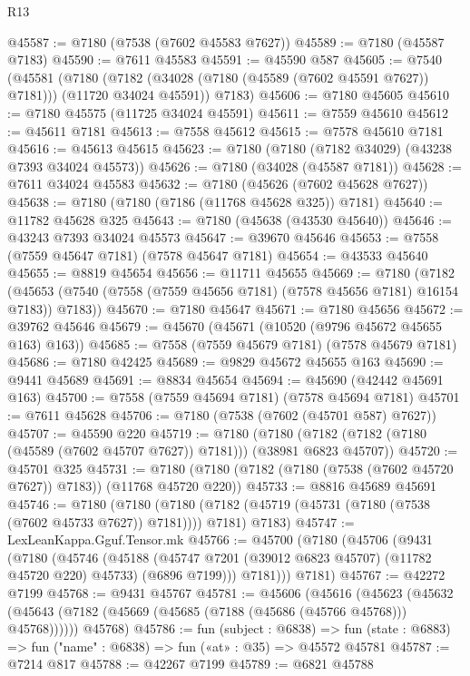 \begin{lexlean}{R13}
\begin{coremodule}
@45587 := @7180 (@7538 (@7602 @45583 @7627))
@45589 := @7180 (@45587 @7183)
@45590 := @7611 @45583
@45591 := @45590 @587
@45605 := @7540
    (@45581
      (@7180 (@7182 (@34028 (@7180 (@45589 (@7602 @45591 @7627)) @7181))) (@11720 @34024 @45591))
      @7183)
@45606 := @7180 @45605
@45610 := @7180 @45575 (@11725 @34024 @45591)
@45611 := @7559 @45610
@45612 := @45611 @7181
@45613 := @7558 @45612
@45615 := @7578 @45610 @7181
@45616 := @45613 @45615
@45623 := @7180 (@7180 (@7182 @34029) (@43238 @7393 @34024 @45573))
@45626 := @7180 (@34028 (@45587 @7181))
@45628 := @7611 @34024 @45583
@45632 := @7180 (@45626 (@7602 @45628 @7627))
@45638 := @7180 (@7180 (@7186 (@11768 @45628 @325)) @7181)
@45640 := @11782 @45628 @325
@45643 := @7180 (@45638 (@43530 @45640))
@45646 := @43243 @7393 @34024 @45573
@45647 := @39670 @45646
@45653 := @7558 (@7559 @45647 @7181) (@7578 @45647 @7181)
@45654 := @43533 @45640
@45655 := @8819 @45654
@45656 := @11711 @45655
@45669 := @7180
    (@7182 (@45653 (@7540 (@7558 (@7559 @45656 @7181) (@7578 @45656 @7181) @16154 @7183)) @7183))
@45670 := @7180 @45647
@45671 := @7180 @45656
@45672 := @39762 @45646
@45679 := @45670 (@45671 (@10520 (@9796 @45672 @45655 @163) @163))
@45685 := @7558 (@7559 @45679 @7181) (@7578 @45679 @7181)
@45686 := @7180 @42425
@45689 := @9829 @45672 @45655 @163
@45690 := @9441 @45689
@45691 := @8834 @45654
@45694 := @45690 (@42442 @45691 @163)
@45700 := @7558 (@7559 @45694 @7181) (@7578 @45694 @7181)
@45701 := @7611 @45628
@45706 := @7180 (@7538 (@7602 (@45701 @587) @7627))
@45707 := @45590 @220
@45719 := @7180
    (@7180 (@7182 (@7182 (@7180 (@45589 (@7602 @45707 @7627)) @7181))) (@38981 @6823 @45707))
@45720 := @45701 @325
@45731 := @7180 (@7180 (@7182 (@7180 (@7538 (@7602 @45720 @7627)) @7183)) (@11768 @45720 @220))
@45733 := @8816 @45689 @45691
@45746 := @7180
    (@7180 (@7180 (@7182 (@45719 (@45731 (@7180 (@7538 (@7602 @45733 @7627)) @7181)))) @7181) @7183)
@45747 := LexLeanKappa.Gguf.Tensor.mk
@45766 := @45700
    (@7180
      (@45706
        (@9431
          (@7180
            (@45746
              (@45188
                (@45747 @7201 (@39012 @6823 @45707) (@11782 @45720 @220) @45733)
                (@6896 @7199)))
            @7181)))
      @7181)
@45767 := @42272 @7199
@45768 := @9431 @45767
@45781 := @45606
    (@45616
      (@45623 (@45632 (@45643 (@7182 (@45669 (@45685 (@7188 (@45686 (@45766 @45768))) @45768))))))
      @45768)
@45786 := fun (subject : @6838) =>
  fun (state : @6883) => fun ("name" : @6838) => fun («at» : @35) => @45572 @45781
@45787 := @7214 @817
@45788 := @42267 @7199
@45789 := @6821 @45788

\end{coremodule}
\end{lexlean}
